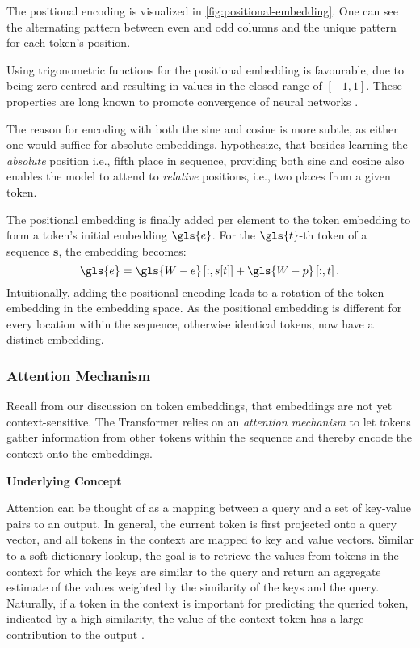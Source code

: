 The positional encoding is visualized in \cref{fig:positional-embedding}. One can see the alternating pattern between even and odd columns and the unique pattern for each \gls{token}'s position.

Using trigonometric functions for the positional embedding is favourable, due to being zero-centred and resulting in values in the closed range of $[-1,1]$. These properties are long known to promote convergence of neural networks \autocites[][8-9]{lecunEfficientBackProp2012}[][2]{ioffeBatchNormalizationAccelerating2015}.

The reason for encoding with both the sine and cosine is more subtle, as either one would suffice for absolute embeddings. \textcite[][6]{vaswaniAttentionAllYou2017} hypothesize, that besides learning the \emph{absolute} position i.e., fifth place in sequence, providing both sine and cosine also enables the model to attend to \emph{relative} positions, i.e., two places from a given \gls{token}.

The positional embedding is finally added per element to the token embedding to form a \gls{token}'s initial embedding $\gls{e}$. For the $\gls{t}$-th \gls{token} of a sequence $\mathbf{s}$, the embedding becomes:
\begin{equation}
    \gls{e}=\gls{W-e}\left[:, s[t]\right]+\gls{W-p}\left[:, t\right].
    \label{eq:positional-embedding}
\end{equation}
Intuitionally, adding the positional encoding leads to a rotation of the \gls{token} embedding in the embedding space. As the positional embedding is different for every location within the sequence, otherwise identical \glspl{token}, now have a distinct embedding.

\subsubsection{Attention Mechanism}\label{sec:attention}

Recall from our discussion on token embeddings, that embeddings are not yet context-sensitive. The Transformer relies on an \emph{attention mechanism} to let tokens gather information from other tokens within the sequence and thereby encode the context onto the embeddings.

\textbf{Underlying Concept}

Attention can be thought of as a mapping between a query and a set of key-value pairs to an output. In general, the current token is first projected onto a query vector, and all tokens in the context are mapped to key and value vectors. Similar to a soft dictionary lookup, the goal is to retrieve the values from tokens in the context for which the keys are similar to the query and return an aggregate estimate of the values weighted by the similarity of the keys and the query. Naturally, if a token in the context is important for predicting the queried token, indicated by a high similarity, the value of the context token has a large contribution to the output \autocites[][5]{phuongFormalAlgorithmsTransformers2022}[][3]{vaswaniAttentionAllYou2017}.


